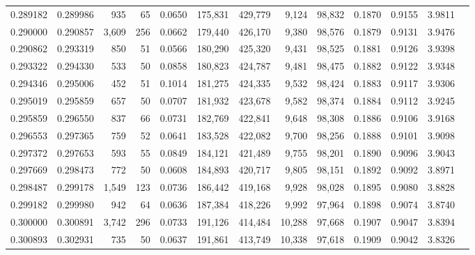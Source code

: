 \begin{tabular}{rrrrrrrrrrrrr}
0.289182 & 0.289986 &   935 &  65 &                                     0.0650 & 175,831 & 429,779 &   9,124 &  98,832 & 0.1870 & 0.9155 & 3.9811 \\
0.290000 & 0.290857 & 3,609 & 256 &                                     0.0662 & 179,440 & 426,170 &   9,380 &  98,576 & 0.1879 & 0.9131 & 3.9476 \\
0.290862 & 0.293319 &   850 &  51 &                                     0.0566 & 180,290 & 425,320 &   9,431 &  98,525 & 0.1881 & 0.9126 & 3.9398 \\
0.293322 & 0.294330 &   533 &  50 &                                     0.0858 & 180,823 & 424,787 &   9,481 &  98,475 & 0.1882 & 0.9122 & 3.9348 \\
0.294346 & 0.295006 &   452 &  51 &                                     0.1014 & 181,275 & 424,335 &   9,532 &  98,424 & 0.1883 & 0.9117 & 3.9306 \\
0.295019 & 0.295859 &   657 &  50 &                                     0.0707 & 181,932 & 423,678 &   9,582 &  98,374 & 0.1884 & 0.9112 & 3.9245 \\
0.295859 & 0.296550 &   837 &  66 &                                     0.0731 & 182,769 & 422,841 &   9,648 &  98,308 & 0.1886 & 0.9106 & 3.9168 \\
0.296553 & 0.297365 &   759 &  52 &                                     0.0641 & 183,528 & 422,082 &   9,700 &  98,256 & 0.1888 & 0.9101 & 3.9098 \\
0.297372 & 0.297653 &   593 &  55 &                                     0.0849 & 184,121 & 421,489 &   9,755 &  98,201 & 0.1890 & 0.9096 & 3.9043 \\
0.297669 & 0.298473 &   772 &  50 &                                     0.0608 & 184,893 & 420,717 &   9,805 &  98,151 & 0.1892 & 0.9092 & 3.8971 \\
0.298487 & 0.299178 & 1,549 & 123 &                                     0.0736 & 186,442 & 419,168 &   9,928 &  98,028 & 0.1895 & 0.9080 & 3.8828 \\
0.299182 & 0.299980 &   942 &  64 &                                     0.0636 & 187,384 & 418,226 &   9,992 &  97,964 & 0.1898 & 0.9074 & 3.8740 \\
0.300000 & 0.300891 & 3,742 & 296 &                                     0.0733 & 191,126 & 414,484 &  10,288 &  97,668 & 0.1907 & 0.9047 & 3.8394 \\
0.300893 & 0.302931 &   735 &  50 &                                     0.0637 & 191,861 & 413,749 &  10,338 &  97,618 & 0.1909 & 0.9042 & 3.8326 \\

\end{tabular}
